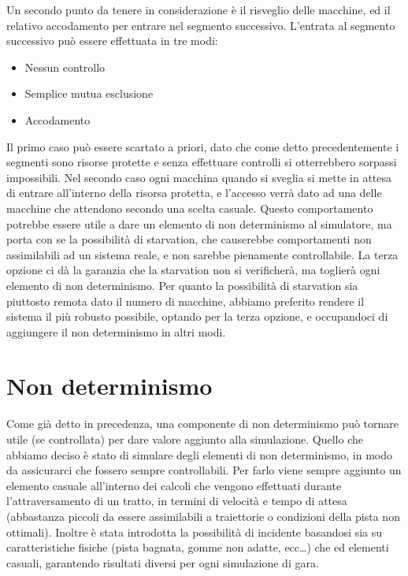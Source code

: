 Un secondo punto da tenere in considerazione è il risveglio delle macchine, ed il relativo accodamento per entrare nel segmento successivo.
L’entrata al segmento successivo può essere effettuata in tre modi:
\begin{itemize}
 \item Nessun controllo
 \item Semplice mutua esclusione
 \item Accodamento
\end{itemize}
Il primo caso può essere scartato a priori, dato che come detto precedentemente i segmenti sono risorse protette e senza effettuare controlli si otterrebbero sorpassi impossibili.
Nel secondo caso ogni macchina quando si sveglia si mette in attesa di entrare all’interno della risorsa protetta, e l’accesso verrà dato ad una delle macchine che attendono secondo una scelta casuale. Questo comportamento potrebbe essere utile a dare un elemento di non determinismo al simulatore, ma porta con se la possibilità di starvation, che causerebbe comportamenti non assimilabili ad un sistema reale, e non sarebbe pienamente controllabile.
La terza opzione ci dà la garanzia che la starvation non si verificherà, ma toglierà ogni elemento di non determinismo.
Per quanto la possibilità di starvation sia piuttosto remota dato il numero di macchine, abbiamo preferito rendere il sistema il più robusto possibile, optando per la terza opzione, e occupandoci di aggiungere il non determinismo in altri modi.

\section{Non determinismo}

Come già detto in precedenza, una componente di non determinismo può tornare utile (se controllata) per dare valore aggiunto alla simulazione.
Quello che abbiamo deciso è stato di simulare degli elementi di non determinismo, in modo da assicurarci che fossero sempre controllabili.
Per farlo viene sempre aggiunto un elemento casuale all’interno dei calcoli che vengono effettuati durante l’attraversamento di un tratto, in termini di velocità e tempo di attesa (abbastanza piccoli da essere assimilabili a traiettorie o condizioni della pista non ottimali). Inoltre è stata introdotta la possibilità di incidente basandosi sia su caratteristiche fisiche (pista bagnata, gomme non adatte, ecc…) che ed elementi casuali, garantendo risultati diversi per ogni simulazione di gara.

